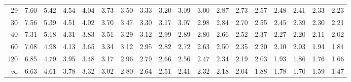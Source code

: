 \begin{mvtable}
{\begin{tabular}{r|*{17}{r}}
29 & 7.60 & 5.42 & 4.54 & 4.04 & 3.73 & 3.50 & 3.33 & 3.20 & 3.09 & 3.00 & 2.87 & 2.73 & 2.57 & 2.48 & 2.41 & 2.33 & 2.23\\
30 & 7.56 & 5.39 & 4.51 & 4.02 & 3.70 & 3.47 & 3.30 & 3.17 & 3.07 & 2.98 & 2.84 & 2.70 & 2.55 & 2.45 & 2.39 & 2.30 & 2.21\\
40 & 7.31 & 5.18 & 4.31 & 3.83 & 3.51 & 3.29 & 3.12 & 2.99 & 2.89 & 2.80 & 2.66 & 2.52 & 2.37 & 2.27 & 2.20 & 2.11 & 2.02\\
60 & 7.08 & 4.98 & 4.13 & 3.65 & 3.34 & 3.12 & 2.95 & 2.82 & 2.72 & 2.63 & 2.50 & 2.35 & 2.20 & 2.10 & 2.03 & 1.94 & 1.84\\
120 & 6.85 & 4.79 & 3.95 & 3.48 & 3.17 & 2.96 & 2.79 & 2.66 & 2.56 & 2.47 & 2.34 & 2.19 & 2.03 & 1.93 & 1.86 & 1.76 & 1.66\\
$\infty$ & 6.63 & 4.61 & 3.78 & 3.32 & 3.02 & 2.80 & 2.64 & 2.51 & 2.41 & 2.32 & 2.18 & 2.04 & 1.88 & 1.78 & 1.70 & 1.59 & 1.47\\
\bottomrule
\end{tabular}}
\end{mvtable}
